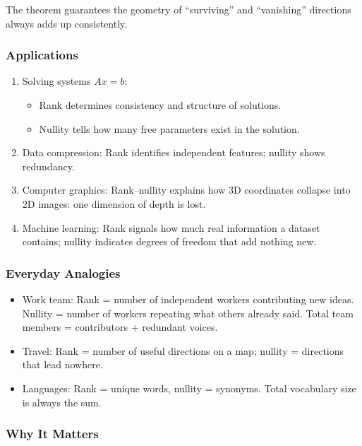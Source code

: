 \documentclass[
  letterpaper,
  DIV=11,
  numbers=noendperiod]{scrreprt}
\providecommand{\tightlist}{%
  \setlength{\itemsep}{0pt}\setlength{\parskip}{0pt}}
\begin{document}
The theorem guarantees the geometry of ``surviving'' and ``vanishing''
directions always adds up consistently.

\subsubsection{Applications}\label{applications-1}

\begin{enumerate}
\def\labelenumi{\arabic{enumi}.}
\item
  Solving systems \(Ax = b\):

  \begin{itemize}
  \tightlist
  \item
    Rank determines consistency and structure of solutions.
  \item
    Nullity tells how many free parameters exist in the solution.
  \end{itemize}
\item
  Data compression: Rank identifies independent features; nullity shows
  redundancy.
\item
  Computer graphics: Rank--nullity explains how 3D coordinates collapse
  into 2D images: one dimension of depth is lost.
\item
  Machine learning: Rank signals how much real information a dataset
  contains; nullity indicates degrees of freedom that add nothing new.
\end{enumerate}

\subsubsection{Everyday Analogies}\label{everyday-analogies-33}

\begin{itemize}
\tightlist
\item
  Work team: Rank = number of independent workers contributing new
  ideas. Nullity = number of workers repeating what others already said.
  Total team members = contributors + redundant voices.
\item
  Travel: Rank = number of useful directions on a map; nullity =
  directions that lead nowhere.
\item
  Languages: Rank = unique words, nullity = synonyms. Total vocabulary
  size is always the sum.
\end{itemize}

\subsubsection{Why It Matters}\label{why-it-matters-33}
\end{document}
